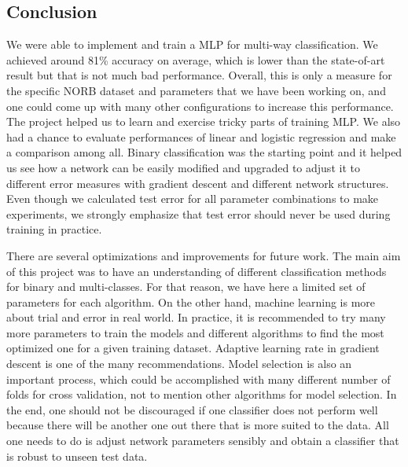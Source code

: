 \documentclass[10pt]{article}
\begin{document}
\subsection{Conclusion}
We were able to implement and train a MLP for multi-way classification. We achieved around 81\% accuracy on average, which is lower than the state-of-art result but that is not much bad performance. Overall, this is only a measure for the specific NORB dataset and parameters that we have been working on, and one could come up with many other configurations to increase this performance. The project helped us to learn and exercise tricky parts of training MLP. We also had a chance to evaluate performances of linear and logistic regression and make a comparison among all. Binary classification was the starting point and it helped us see how a network can be easily modified and upgraded to adjust it to different error measures with gradient descent and different network structures. Even though we calculated test error for all parameter combinations to make experiments, we strongly emphasize that test error should never be used during training in practice.

There are several optimizations and improvements for future work. The main aim of this project was to have an understanding of different classification methods for binary and multi-classes. For that reason, we have here a limited set of parameters for each algorithm. On the other hand, machine learning is more about trial and error in real world. In practice, it is recommended to try many more parameters to train the models and different algorithms to find the most optimized one for a given training dataset. Adaptive learning rate in gradient descent is one of the many recommendations. Model selection is also an important process, which could be accomplished with many different number of folds for cross validation, not to mention other algorithms for model selection. In the end, one should not be discouraged if one classifier does not perform well because there will be another one out there that is more suited to the data. All one needs to do is adjust network parameters sensibly and obtain a classifier that is robust to unseen test data.
\end{document}
